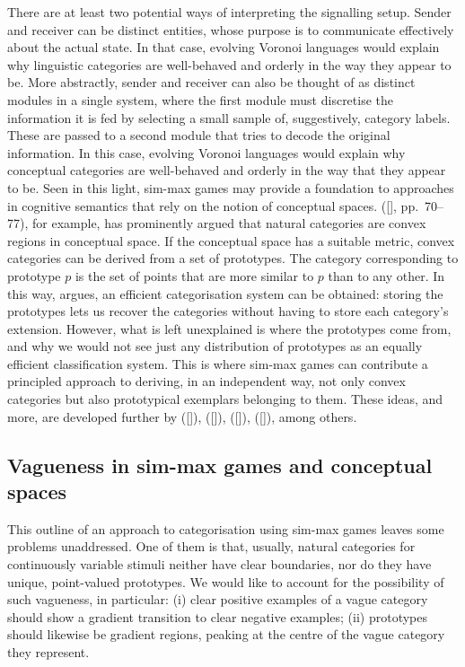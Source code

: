 \documentclass[12pt,english]{article}
\numberwithin{equation}{section}
\newcommand{\citetbjps}[1]{\citeauthor{#1} ([\citeyear{#1}])}
\newcommand{\citetbjpspost}[2]{\citeauthor{#2} ([\citeyear{#2}], #1)}
\begin{document}
There are at least two potential ways of interpreting the signalling setup.  Sender and
receiver can be distinct entities, whose purpose is to communicate effectively about the actual
state. In that case, evolving Voronoi languages would explain why linguistic categories are
well-behaved and orderly in the way they appear to be. More abstractly, sender and receiver can
also be thought of as distinct modules in a single system, where the first module must
discretise the information it is fed by selecting a small sample of, suggestively, category
labels. These are passed to a second module that tries to decode the original information. In
this case, evolving Voronoi languages would explain why conceptual categories are well-behaved
and orderly in the way that they appear to be.  Seen in this light, sim-max games may provide a
foundation to approaches in cognitive semantics that rely on the notion of conceptual spaces.
\citetbjpspost{pp.~70--77}{Gardenfors2000:Conceptual-Spac}, for example, has prominently argued
that natural categories are convex regions in conceptual space. If the conceptual space has a
suitable metric, convex categories can be derived from a set of prototypes. The category
corresponding to prototype $p$ is the set of points that are more similar to $p$ than to any
other. In this way, \citeauthor{Gardenfors2000:Conceptual-Spac} argues, an efficient
categorisation system can be obtained: storing the prototypes lets us recover the categories
without having to store each category's extension. However, what is left unexplained is where
the prototypes come from, and why we would not see just any distribution of prototypes as an
equally efficient classification system. This is where sim-max games can contribute a
principled approach to deriving, in an independent way, not only convex categories but also
prototypical exemplars belonging to them.  These ideas, and more, are developed further by
\citetbjps{Jager2007:The-Evolution-o}, \citetbjps{JagerRooijvan-Rooij2007:Language-Struct}, \citetbjps{JagerMetzger2011:Voronoi-Languag}, \citetbjps{OConnor2014-OCOEPC}, among
others.

\subsection{Vagueness in sim-max games and conceptual spaces}
\label{sec:vagueness-in-sim-max-games}

This outline of an approach to categorisation using sim-max games
leaves some problems unaddressed. One of them is that, usually, natural
categories for continuously variable stimuli neither have
clear boundaries, nor do they have unique, point-valued prototypes. We
would like to account for the possibility of such vagueness, in
particular: (i) clear positive examples of a vague category should
show a gradient transition to clear negative examples;
(ii) prototypes should likewise be gradient regions, peaking at the
centre of the vague category they represent.
\end{document}
